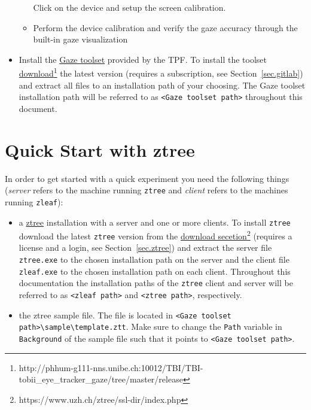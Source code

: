 \documentclass[a4paper,oneside]{book}
\begin{document}
\begin{itemize}
\begin{itemize}
                Click on the device and setup the screen calibration.
            \item Perform the device calibration and verify the gaze accuracy through the built-in gaze visualization
        \end{itemize}
    \item Install the \href{http://phhum-g111-nns.unibe.ch:10012/TBI/TBI-tobii_eye_tracker_gaze}{Gaze toolset} provided by the TPF.
        To install the toolset \href{http://phhum-g111-nns.unibe.ch:10012/TBI/TBI-tobii_eye_tracker_gaze/tree/master/release}{download}\footnote{http://phhum-g111-nns.unibe.ch:10012/TBI/TBI-tobii\_eye\_tracker\_gaze/tree/master/release} the latest version (requires a subscription, see Section~\ref{sec.gitlab}) and extract all files to an installation path of your choosing.
        The Gaze toolset installation path will be referred to as \texttt{<Gaze toolset path>} throughout this document.
\end{itemize}


\section{Quick Start with ztree}
\label{sec.quick.ztree}
In order to get started with a quick experiment you need the following things (\emph{server} refers to the machine running \texttt{ztree} and \emph{client} refers to the machines running \texttt{zleaf}):
\begin{itemize}
    \item a \href{http://www.ztree.uzh.ch/en.html}{ztree} installation with a server and one or more clients.
        To install \texttt{ztree} download the latest \texttt{ztree} version from the \href{https://www.uzh.ch/ztree/ssl-dir/index.php}{download secetion}\footnote{https://www.uzh.ch/ztree/ssl-dir/index.php} (requires a license and a login, see Section~\ref{sec.ztree}) and extract the server file \texttt{ztree.exe} to the chosen installation path on the server and the client file \texttt{zleaf.exe} to the chosen installation path on each client.
        Throughout this documentation the installation paths of the \texttt{ztree} client and server will be referred to as \texttt{<zleaf path>} and \texttt{<ztree path>}, respectively.
    \item the ztree sample file.
        The file is located in \texttt{<Gaze toolset path>\textbackslash sample\textbackslash template.ztt}.
        Make sure to change the \texttt{Path} variable in \texttt{Background} of the sample file such that it points to \texttt{<Gaze toolset path>}.
\end{itemize}
\end{document}
